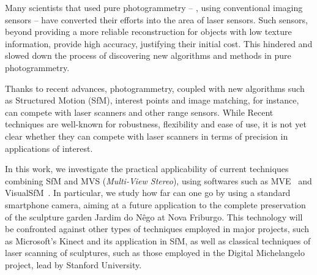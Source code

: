 \documentclass[a4paper,12pt,oneside,onecolumn,final,fleqn]{repUERJ}
\theoremstyle{plain}
\theoremstyle{definition}
\newcounter{ct}
\begin{document}
Many scientists that used pure photogrammetry -- \ie, using conventional
imaging sensors -- have converted their efforts into the area of laser sensors.
Such sensors, beyond providing a more reliable reconstruction for
objects with low texture information, provide high accuracy, justifying their
initial cost.  This hindered and slowed down the process of discovering new algorithms
and methods in pure photogrammetry.

Thanks to recent advances, photogrammetry, coupled with new algorithms
such as Structured Motion (SfM), interest points and image matching, for instance,
can compete with laser scanners and other range sensors. While Recent techniques are well-known for robustness, flexibility and ease of use, it is not yet clear whether they can compete with laser scanners in terms of precision in applications of interest.

In this work, we investigate the practical applicability of current techniques
combining SfM and MVS (\emph{Multi-View Stereo}), using softwares such as
MVE~\cite{mve} and VisualSfM~\cite{wu2011visualsfm}. In particular, we study
how far can one go by using a standard smartphone camera, aiming at a future application to the complete preservation of the sculpture garden Jardim do Nêgo at Nova Friburgo. 
This technology will be confronted against other types of techniques employed in
major projects, such as Microsoft's Kinect and its application in SfM, as well as
classical techniques of laser scanning of sculptures, such as those employed in
the Digital Michelangelo project, lead by Stanford University.



\printkeys


\listadefiguras

\end{document}

